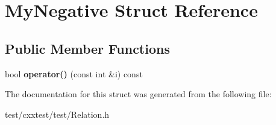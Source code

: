 \hypertarget{structMyNegative}{\section{My\-Negative Struct Reference}
\label{structMyNegative}
}
\subsection*{Public Member Functions}
\begin{DoxyCompactItemize}
\item 
\hypertarget{structMyNegative_a734c57e25c9b34951ec9936c33b95594}{bool {\bfseries operator()} (const int \&i) const }\label{structMyNegative_a734c57e25c9b34951ec9936c33b95594}

\end{DoxyCompactItemize}


The documentation for this struct was generated from the following file\-:\begin{DoxyCompactItemize}
\item 
test/cxxtest/test/Relation.\-h\end{DoxyCompactItemize}
